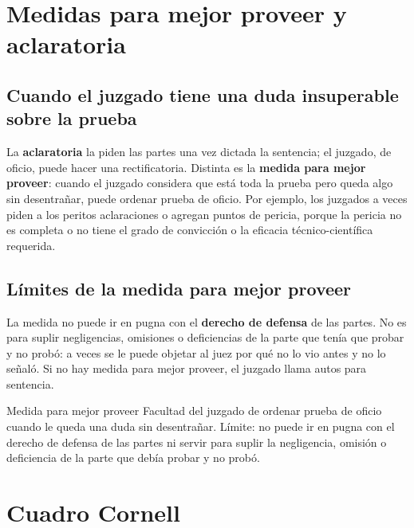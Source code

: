 \documentclass[12pt,oneside]{book}
\begin{document}
\section{Medidas para mejor proveer y aclaratoria}

\subsection{Cuando el juzgado tiene una duda insuperable sobre la prueba}

La \textbf{aclaratoria} la piden las partes una vez dictada la sentencia; el juzgado, de oficio, puede hacer una rectificatoria. Distinta es la \textbf{medida para mejor proveer}: cuando el juzgado considera que est\'a toda la prueba pero queda algo sin desentra\~nar, puede ordenar prueba de oficio. Por ejemplo, los juzgados a veces piden a los peritos aclaraciones o agregan puntos de pericia, porque la pericia no es completa o no tiene el grado de convicci\'on o la eficacia t\'ecnico-cient\'ifica requerida.

\subsection{L\'imites de la medida para mejor proveer}

La medida no puede ir en pugna con el \textbf{derecho de defensa} de las partes. No es para suplir negligencias, omisiones o deficiencias de la parte que ten\'ia que probar y no prob\'o: a veces se le puede objetar al juez por qu\'e no lo vio antes y no lo se\~nal\'o. Si no hay medida para mejor proveer, el juzgado llama autos para sentencia.

\begin{definition}{Medida para mejor proveer}
Facultad del juzgado de ordenar prueba de oficio cuando le queda una duda sin desentra\~nar. L\'imite: no puede ir en pugna con el derecho de defensa de las partes ni servir para suplir la negligencia, omisi\'on o deficiencia de la parte que deb\'ia probar y no prob\'o.
\end{definition}

\section{Cuadro Cornell}
\end{document}
